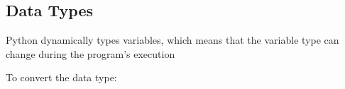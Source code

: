 \subsection{Data Types}
    Python dynamically types variables, which means that the variable type can change during the program's execution
    
    To convert the data type:
    
    